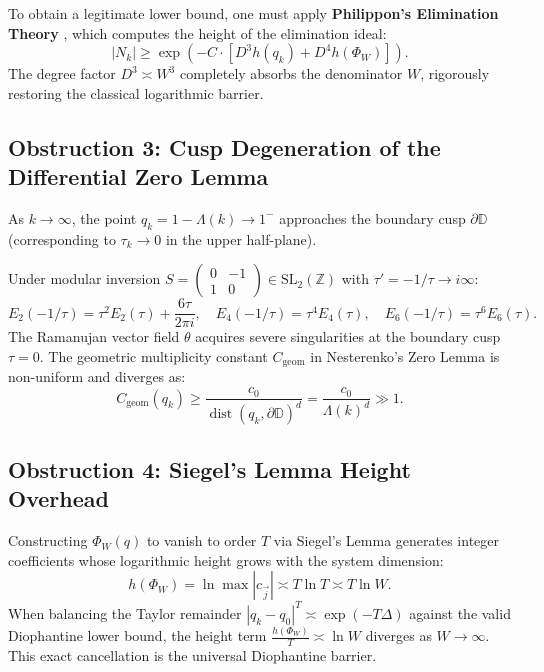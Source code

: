 \documentclass[11pt,reqno]{article}
\theoremstyle{plain}
\theoremstyle{definition}
\numberwithin{equation}{section}
\begin{document}
To obtain a legitimate lower bound, one must apply \textbf{Philippon's Elimination Theory} \cite{philippon1986}, which computes the height of the elimination ideal:
\begin{equation}
|N_k| \ge \exp\left( - C \cdot \left[ D^3 h(q_k) + D^4 h(\Phi_W) \right] \right).
\end{equation}
The degree factor $D^3 \asymp W^3$ completely absorbs the denominator $W$, rigorously restoring the classical logarithmic barrier.

\subsection{Obstruction 3: Cusp Degeneration of the Differential Zero Lemma}
As $k \to \infty$, the point $q_k = 1 - \Lambda(k) \to 1^-$ approaches the boundary cusp $\partial \mathbb{D}$ (corresponding to $\tau_k \to 0$ in the upper half-plane).

Under modular inversion $S = \begin{pmatrix} 0 & -1 \\ 1 & 0 \end{pmatrix} \in \mathrm{SL}_2(\mathbb{Z})$ with $\tau' = -1/\tau \to i\infty$:
\begin{equation}
E_2(-1/\tau) = \tau^2 E_2(\tau) + \frac{6\tau}{2\pi i}, \quad E_4(-1/\tau) = \tau^4 E_4(\tau), \quad E_6(-1/\tau) = \tau^6 E_6(\tau).
\end{equation}
The Ramanujan vector field $\theta$ acquires severe singularities at the boundary cusp $\tau = 0$. The geometric multiplicity constant $C_{\mathrm{geom}}$ in Nesterenko's Zero Lemma is non-uniform and diverges as:
\begin{equation}
C_{\mathrm{geom}}(q_k) \ge \frac{c_0}{\operatorname{dist}(q_k, \partial \mathbb{D})^d} = \frac{c_0}{\Lambda(k)^d} \gg 1.
\end{equation}

\subsection{Obstruction 4: Siegel's Lemma Height Overhead}
Constructing $\Phi_W(q)$ to vanish to order $T$ via Siegel's Lemma generates integer coefficients whose logarithmic height grows with the system dimension:
\begin{equation}
h(\Phi_W) = \ln \max |c_{\vec{j}}| \asymp T \ln T \asymp T \ln W.
\end{equation}
When balancing the Taylor remainder $|q_k - q_0|^T \asymp \exp(-T \Delta)$ against the valid Diophantine lower bound, the height term $\frac{h(\Phi_W)}{T} \asymp \ln W$ diverges as $W \to \infty$. This exact cancellation is the universal Diophantine barrier.
\end{document}
